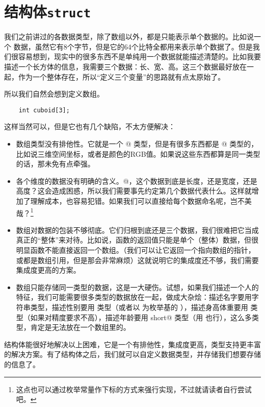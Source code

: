 \section{结构体\texttt{struct}}
我们之前讲过的各数据类型，除了数组以外，都是只能表示单个数据的。比如说一个 \lstinline@double@ 数据，虽然它有8个字节，但是它的64个比特全都用来表示单个数据了。但是我们很容易想到，现实中的很多东西不是单纯用一个数据就能描述清楚的。比如我要描述一个长方体的信息，我需要三个数据：长、宽、高。这三个数据最好放在一起，作为一个整体存在，所以``定义三个变量''的思路就有点太原始了。\par
所以我们自然会想到定义数组。
\begin{lstlisting}
    int cuboid[3];
\end{lstlisting}
这样当然可以，但是它也有几个缺陷，不太方便解决：
\begin{itemize}
    \item 数组类型没有排他性。它就是一个 \lstinline@int[3]@ 类型，但是有很多东西都是 \lstinline@int[3]@ 类型的，比如说三维空间坐标，或者是颜色的RGB值。如果说这些东西都算是同一类型的话，那未免有点牵强。
    \item 各个维度的数据没有明确的含义。\lstinline@cuboid[0]@，这个数据到底是长度，还是宽度，还是高度？这会造成困惑，所以我们需要事先约定第几个数据代表什么。这样就增加了理解成本，也容易犯错。如果我们可以直接给每个数据命名呢，岂不美哉？\footnote{这点也可以通过枚举常量作下标的方式来强行实现，不过就请读者自行尝试吧。}
    \item 数组对数据的包装不够彻底。它们归根到底还是三个数据，我们很难把它当成真正的``整体''来对待。比如说，函数的返回值只能是单个（整体）数据，但很明显函数不能直接返回一个数组。（我们可以让它返回一个指向数组的指针，或都是数组引用，但是那会非常麻烦）这就说明它的集成度还不够，我们需要集成度更高的方案。
    \item 数组只能存储同一类型的数据，这是一大硬伤。试想，如果我们描述一个人的特征，我们可能需要很多类型的数据放在一起，做成大杂烩：描述名字要用字符串类型，描述性别要用 \lstinline@bool@ 类型（或者以 \lstinline@bool@ 为枚举基的 \lstinline@Sex@），描述身高体重要用 \lstinline@float@ 类型（如果对精度要求不高），描述年龄要用 \lstinline@unsigned short@ 类型（用 \lstinline@int@ 也行），这么多类型，肯定是无法放在一个数组里的。
\end{itemize}
结构体能很好地解决以上困难，它是一个有排他性，集成度更高，类型支持更丰富的解决方案。有了结构体之后，我们就可以自定义数据类型，并存储我们想要存储的信息了。\par
